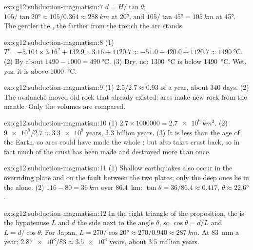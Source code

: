 \begin{solution}{exo:g12:subduction-magmatism:7}
$d = H/\tan\theta$: $105/\tan\ang{20} \approx 105/0.364 \approx
\qty{288}{km}$ at \ang{20}, and $105/\tan\ang{45} = \qty{105}{km}$ at
\ang{45}. The gentler the , the farther from the trench the arc stands.
\end{solution}

\begin{solution}{exo:g12:subduction-magmatism:8}
(1) $T = -5.104 \times 3.16^2 + 132.9 \times 3.16 + 1120.7 \approx -51.0 +
420.0 + 1120.7 \approx \qty{1490}{\celsius}$. (2) By about $1490 - 1000 =
\qty{490}{\celsius}$. (3) Dry, no: \qty{1300}{\celsius} is below
\qty{1490}{\celsius}. Wet, yes: it is above \qty{1000}{\celsius}.
\end{solution}

\begin{solution}{exo:g12:subduction-magmatism:9}
(1) $2.5/2.7 \approx 0.93$ of a year, about 340 days. (2) The avalanche moved
old rock that already existed; arcs make new rock from the mantle. Only the
volumes are compared.
\end{solution}

\begin{solution}{exo:g12:subduction-magmatism:10}
(1) $2.7 \times \num{1000000} = \qty{2.7e6}{km^3}$. (2) $\num{9e9}/2.7
\approx \num{3.3e9}$ years, 3.3 billion years. (3) It is less than the age of
the Earth, so arcs could have made the whole ; but
 also takes crust back, so in fact much of the crust has been
made and destroyed more than once.
\end{solution}

\begin{solution}{exo:g12:subduction-magmatism:11}
(1) Shallow earthquakes also occur in the overriding plate and on the fault
between the two plates; only the deep ones lie in the  alone.
(2) $116 - 80 = \qty{36}{km}$ over \qty{86.4}{km}: $\tan\theta = 36/86.4
\approx 0.417$, $\theta \approx \ang{22.6}$.
\end{solution}

\begin{solution}{exo:g12:subduction-magmatism:12}
In the right triangle of the proposition, the  is the hypotenuse $L$
and $d$ the side next to the angle $\theta$, so $\cos\theta = d/L$ and $L =
d/\cos\theta$. For Japan, $L = 270/\cos\ang{20} \approx 270/0.940 \approx
\qty{287}{km}$. At \qty{83}{mm} a year: $\num{2.87e8}/83 \approx \num{3.5e6}$
years, about 3.5 million years.
\end{solution}


